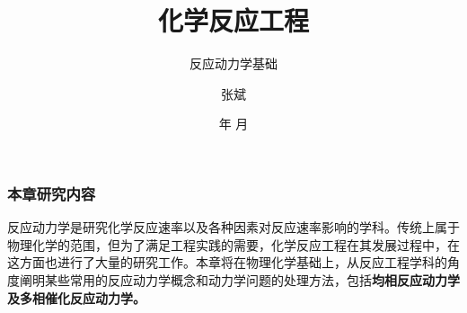 \documentclass[dvipsnames, svgnames, x11names]{beamer}
\title{化学反应工程}
\subtitle{反应动力学基础}
\author{张斌}
\institute[理工系]{河北农业大学 理工系}
\date{\the\year 年 \the\month 月}
\begin{document}
\maketitle


\begin{frame}
	\frametitle{本章研究内容}
	\qquad \Large 反应动力学是研究化学反应速率以及各种因素对反应速率影响的学科。传统上属于物理化学的范围，但为了满足工程实践的需要，化学反应工程在其发展过程中，在这方面也进行了大量的研究工作。本章将在物理化学基础上，从反应工程学科的角度阐明某些常用的反应动力学概念和动力学问题的处理方法，包括\bf{均相反应动力学}及\bf{多相催化反应动力学}。
\end{frame}


\begin{frame}{}
	\begin{center}
		\Huge {}
	\end{center}
	\tableofcontents
\end{frame}












\end{document}
